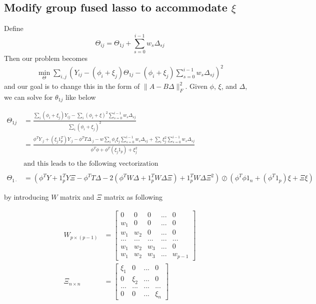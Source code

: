 \documentclass[11pt]{article}
\begin{document}
\subsection*{Modify group fused lasso to accommodate $\xi$}
Define 
$$\Theta_{ij} = \Theta_{1j} + \sum_{s=0}^{i-1} w_s \Delta_{sj}$$
Then our problem becomes
\begin{align}
\min_\Theta \sum_{i,j} 
\left(
Y_{ij} - (\phi_i + \xi_j) \Theta_{1j} - (\phi_i + \xi_j) \sum_{s=0}^{i-1}w_s \Delta_{sj}
\right)^2
\end{align}
and our goal is to change this in the form of $\| A - B\Delta\|^2_F$. Given $\phi$, $\xi$, and $\Delta$, we can solve for $\theta_{1j}$ like below 

\begin{align*}
\Theta_{1j} &= \frac{
\sum_i (\phi_i + \xi_j) Y_{ij} - \sum_i (\phi_i + \xi)^2 \sum_{s=0}^{i-1} w_s \Delta_{sj}
}{\sum_i (\phi_i + \xi_j)^2}\\
&= \frac{
\phi^T Y_{\cdot j} + (\xi_j 1^T_p) Y_{\cdot j} - \phi^T T \Delta_{\cdot j}
- w\sum_i \phi_i \xi_j \sum_{s=0}^{i-1} w_s \Delta_{sj}
+ \sum_i \xi_j^2 \sum_{s=0}^{i-1} w_s \Delta_{sj}
}{\phi^T \phi + \phi^T (\xi_j 1_p) + \xi_j ^2}\\
\\
&\text{and this leads to the following vectorization }\\
\\
\Theta_{1 \cdot} & = \left(\phi^TY + 1_p^T Y \Xi - \phi^T T \Delta - 2(\phi^T W \Delta + 1_p^T W \Delta \Xi )  + 1_p^T W \Delta \Xi^2\right) \oslash \left( \phi^T \phi 1_n + (\phi^T 1_p)\xi + \Xi \xi\right)
\end{align*}

by introducing $W$ matrix and $\Xi$ matrix as following

\begin{align*}
W_{p \times (p-1)}& = \begin{bmatrix}
0 & 0 & 0 & ... &0 \\
w_1 & 0 & 0 & ... & 0\\
w_1 & w_2 & 0 & ... & 0\\
... & ... & ... & ... & ...\\
w_1 & w_2 & w_3 & ... & 0\\
w_1 & w_2 & w_3 & ... & w_{p-1}
\end{bmatrix}\\
\Xi_{n \times n} &= \begin{bmatrix}
\xi_1 & 0 & ... & 0\\
0 & \xi_2 & ... & 0\\
... & ... & ... & ...\\
0 & 0 & ... & \xi_n
\end{bmatrix}
\end{align*}
\end{document}
